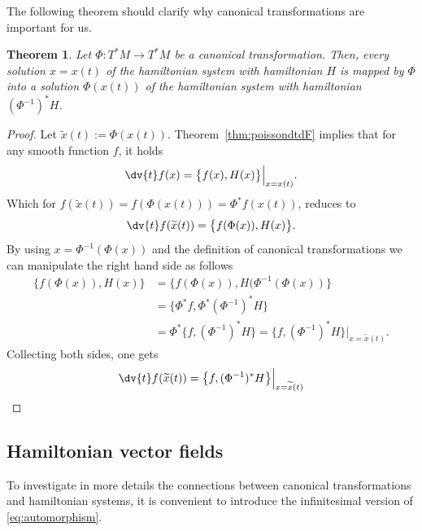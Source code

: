 \documentclass[english,fontsize=11pt,paper=b5]{scrbook}
\newtheorem{theorem}{Theorem}[chapter]
\theoremstyle{definition}
\begin{document}
    The following theorem should clarify why canonical transformations are important for us.
    \begin{theorem}\label{thm:canonicalmapping}
      Let $\Phi: T^*M \to T^* M$ be a canonical transformation.
      Then, every solution $x = x(t)$ of the hamiltonian system with hamiltonian $H$ is mapped by $\Phi$ into a solution $\Phi(x(t))$ of the hamiltonian system with hamiltonian $(\Phi^{-1})^* H$.
    \end{theorem}
    \begin{proof}
      Let $\widetilde x(t) := \Phi(x(t))$. Theorem~\ref{thm:poissondtdF} implies that for any smooth function $f$, it holds
      \begin{equation}
        \dv{t} f(x) = \big\{f(x), H(x)\big\}\Big|_{x=x(t)}.
      \end{equation}
      Which for $f(\widetilde x(t)) = f(\Phi(x(t))) = \Phi^* f(x(t))$, reduces to
      \begin{equation}
        \dv{t} f(\widetilde x(t)) = \big\{f(\Phi(x)), H(x)\big\}.
      \end{equation}
      By using $x = \Phi^{-1}(\Phi(x))$ and the definition of canonical transformations we can manipulate the right hand side as follows
      \begin{align}
        \big\{f(\Phi(x)), H(x)\big\} & = \big\{f(\Phi(x)), H(\Phi^{-1}(\Phi(x))\big\}                                                     \\
                                     & = \big\{\Phi^* f, \Phi^* (\Phi^{-1})^* H\big\}                                                     \\
                                     & = \Phi^* \big\{f, (\Phi^{-1})^* H\big\} = \big\{f, (\Phi^{-1})^* H\big\}\Big|_{x=\widetilde x(t)}.
      \end{align}
      Collecting both sides, one gets
      \begin{equation}
        \dv{t} f(\widetilde x(t)) = \big\{f, (\Phi^{-1})^* H\big\}\Big|_{x=\widetilde x(t)}
      \end{equation}
    \end{proof}

    \subsection{Hamiltonian vector fields}

    To investigate in more details the connections between canonical transformations and hamiltonian systems, it is convenient to introduce the infinitesimal version of \eqref{eq:automorphism}.
\end{document}
